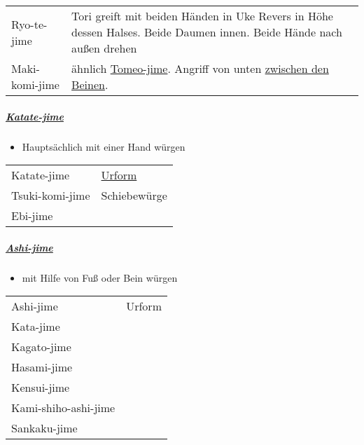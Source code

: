\documentclass[justified, a4paper, notitlepage, captions=tableheading, nobib]{tufte-handout}
\begin{document}
\begin{center}
\begin{tabular}{ll}
\label{org96abec7}Ryo-te-jime & Tori greift mit beiden Händen in Uke Revers in Höhe dessen Halses. Beide Daumen innen. Beide Hände nach außen drehen\\
\label{orga2be512}Maki-komi-jime & ähnlich \hyperref[orgcbb3845]{Tomeo-jime}. Angriff von unten \hyperref[orge217f65]{zwischen den Beinen}.\\
\end{tabular}
\end{center}

\subparagraph{\hyperref[org85b9e23]{Katate-jime}}
\label{sec:orgc20e9fc}

\begin{itemize}
\item Hauptsächlich mit einer Hand würgen
\end{itemize}

\begin{center}
\begin{tabular}{ll}
\label{org85b9e23}Katate-jime & \href{https://www.youtube.com/watch?v=aKEQKdlSjlE}{Urform}\\
\label{orge095161}Tsuki-komi-jime & \label{org357ad43}Schiebewürge\\
\label{org074db16}Ebi-jime & \\
\end{tabular}
\end{center}

\subparagraph{\hyperref[org774718c]{Ashi-jime}}
\label{sec:orge627ab7}

\begin{itemize}
\item mit Hilfe von Fuß oder Bein würgen
\end{itemize}

\begin{center}
\begin{tabular}{ll}
\label{org774718c}Ashi-jime & Urform\\
\label{orge3f3e5c}Kata-jime & \\
\label{org03357f5}Kagato-jime & \\
\label{org0ae0677}Hasami-jime & \\
\label{orgd92f5a7}Kensui-jime & \\
\label{org4fa8ddb}Kami-shiho-ashi-jime & \\
\label{org20b5f32}Sankaku-jime & \\
\end{tabular}
\end{center}
\end{document}
